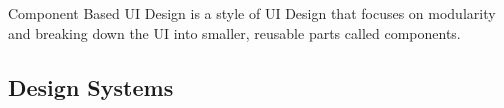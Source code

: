     Component Based UI Design is a style of UI Design that focuses on modularity and breaking down the UI into smaller, reusable parts called components.
    

    \subsection{Design Systems}
